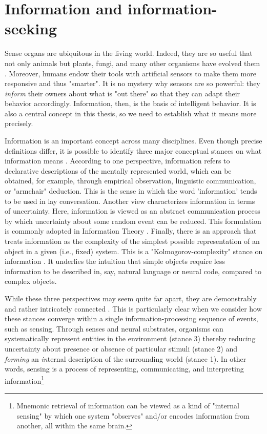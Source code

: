 \section{Information and information-seeking}

Sense organs are ubiquitous in the living world. Indeed, they are so useful that not only animals but plants, fungi, and many other organisms have evolved them \cite{trewavas_plant_2005,braunsdorf_fungal_2016,bourret_census_2006,schwab_evolution_2018}. Moreover, humans endow their tools with artificial sensors to make them more responsive and thus "smarter". %
It is no mystery why sensors are so powerful: they \emph{inform} their owners about what is "out there" so that they can adapt their behavior accordingly. Information, then, is the basis of intelligent behavior. It is also a central concept in this thesis, so we need to establish what it means more precisely. 

Information is an important concept across many disciplines. Even though precise definitions differ, it is possible to identify three major conceptual stances on what information means \cite{adriaans_introduction_2008}. According to one perspective, information refers to declarative descriptions of the mentally represented world, which can be obtained, for example, through empirical observation, linguistic communication, or "armchair" deduction. This is the sense in which the word 'information' tends to be used in lay conversation. Another view characterizes information in terms of uncertainty. Here, information is viewed as an abstract communication process by which uncertainty about some random event can be reduced. This formulation is commonly adopted in Information Theory \cite{shannon_mathematical_1948}. Finally, there is an approach that treats information as the complexity of the simplest possible representation of an object in a given (i.e., fixed) system. This is a "Kolmogorov-complexity" stance on information \cite{kolmogorov1965three}. It underlies the intuition that simple objects require less information to be described in, say, natural language or neural code, compared to complex objects.

While these three perspectives may seem quite far apart, they are demonstrably and rather intricately connected \cite{adriaans_introduction_2008}. This is particularly clear when we consider how these stances converge within a single information-processing sequence of events, such as sensing. Through senses and neural substrates, organisms can systematically represent entities in the environment (stance 3) thereby reducing uncertainty about presence or absence of particular stimuli (stance 2) and \emph{forming} an \emph{in}ternal description of the surrounding world (stance 1). In other words, sensing is a process of representing, communicating, and interpreting information\footnote{Mnemonic retrieval of information can be viewed as a kind of "internal sensing" by which one system "observes" and/or encodes information from another, all within the same brain.}

